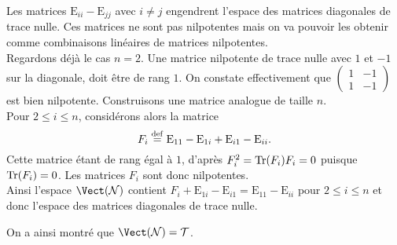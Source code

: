 \begin{solution}
\begin{itemize}
        Les matrices $\mathrm{E}_{ii} - \mathrm{E}_{jj}$ avec $i \not= j$ engendrent l'espace des matrices diagonales de trace nulle. Ces matrices ne sont pas nilpotentes mais on va pouvoir les obtenir comme combinaisons linéaires de matrices nilpotentes. \\
        Regardons déjà le cas $n = 2$. Une matrice nilpotente de trace nulle avec $1$ et $-1$ sur la diagonale, doit être de rang $1$. On constate effectivement que $\begin{pmatrix} 1 & -1 \\ 1 & -1 \end{pmatrix}$ est bien nilpotente. Construisons une matrice analogue de taille $n$. \\
        Pour $2 \leqslant i \leqslant n$, considérons alors la matrice
        $$F_i \overset{\mathrm{\tiny def}}{=} \mathrm{E}_{11} - \mathrm{E}_{1i} + \mathrm{E}_{i1} - \mathrm{E}_{ii}.$$
        Cette matrice étant de rang égal à $1$, d'après  $F_i^2 = \Tr (F_i) F_i = 0$ puisque $\Tr(F_i) = 0$. Les matrices $F_i$ sont donc nilpotentes. \\
        Ainsi l'espace $\Vect(\mathcal{N})$ contient $F_i + \mathrm{E}_{1i} - \mathrm{E}_{i1} = \mathrm{E}_{11}-\mathrm{E}_{ii}$ pour $2 \leqslant i \leqslant n$ et donc l'espace des matrices diagonales de trace nulle. 
    \end{itemize}
    On a ainsi montré que $\Vect(\mathcal{N}) = \mathcal{T}$.
\end{solution}

